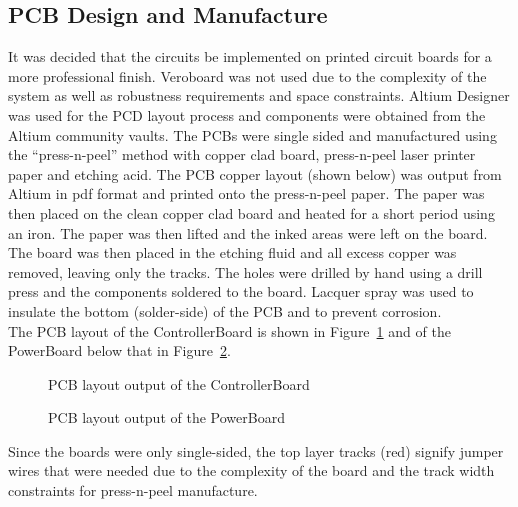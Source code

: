   \subsection{PCB Design and Manufacture}
  \label{sub:PCB Design and Manufacture}
    It was decided that the circuits be implemented on printed circuit boards for a more professional finish. Veroboard was not used due to the complexity of the system as well as robustness requirements and space constraints. Altium Designer was used for the PCD layout process and components were obtained from the Altium community vaults. The PCBs were single sided and manufactured using the ``press-n-peel'' method with copper clad board, press-n-peel laser printer paper and etching acid. The PCB copper layout (shown below) was output from Altium in pdf format and printed onto the press-n-peel paper. The paper was then placed on the clean copper clad board and heated for a short period using an iron. The paper was then lifted and the inked areas were left on the board. The board was then placed in the etching fluid and all excess copper was removed, leaving only the tracks. The holes were drilled by hand using a drill press and the components soldered to the board. Lacquer spray was used to insulate the bottom (solder-side) of the PCB and to prevent corrosion.\\

    The PCB layout of the ControllerBoard is shown in Figure~\ref{fig:ControllerBoardPCB} and of the PowerBoard below that in Figure~\ref{fig:PowerBoardPCBRev1}.

    \begin{figure}[H]
      \begin{center}
        \caption{PCB layout output of the ControllerBoard}
        \label{fig:ControllerBoardPCB}
      \end{center}
    \end{figure}

    \begin{figure}[H]
      \begin{center}
        \caption{PCB layout output of the PowerBoard}
        \label{fig:PowerBoardPCBRev1}
      \end{center}
    \end{figure}

    Since the boards were only single-sided, the top layer tracks (red) signify jumper wires that were needed due to the complexity of the board and the track width constraints for press-n-peel manufacture.\\

